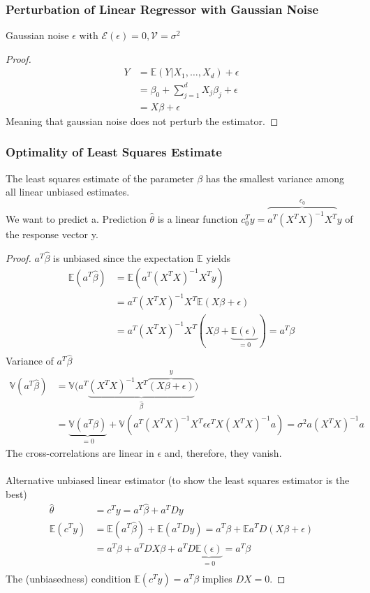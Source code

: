 \documentclass[MachineLearning]{subfiles}
\begin{document}
\subsubsection{Perturbation of Linear Regressor with Gaussian Noise}
Gaussian noise \(\epsilon\) with \(\mathcal{E}(\epsilon) = 0, \mathcal{V} = \sigma^2\)
\begin{proof}
\begin{align}
Y &= \mathbb{E}(Y|X_1 , \ldots , X_d) + \epsilon\\
&= \beta_0 + \sum^d_{j=1} X_j \beta_j + \epsilon\\
&= X\beta + \epsilon
\end{align}
Meaning that gaussian noise does not perturb the estimator.
\end{proof}

\subsubsection{Optimality of Least Squares Estimate}
The least squares estimate of the parameter \(\beta\) has the smallest variance among all linear unbiased estimates.\\
We want to predict a. Prediction \(\hat{\theta}\) is a linear function \(c_0^Ty = \overbrace{a^T (X^T X)^{-1} X^T}^{c_0} y\) of the response vector y.
\begin{proof}

\(a^T \hat{\beta}\) is unbiased since the expectation \(\mathbb{E}\) yields
\begin{align}
\mathbb{E}(a^T \hat{\beta}) &= \mathbb{E}(a^T (X^T X)^{-1} X^T y)\\
&= a^T (X^T X)^{-1} X^T \mathbb{E}(X\beta + \epsilon)\\
&= a^T (X^T X)^{-1} X^T (X\beta + \underbrace{\mathbb{E}(\epsilon)}_{=0} ) = a^T \beta\\
\end{align}
Variance of \(a^T\hat{\beta}\)
\begin{align}
\mathbb{V}(a^T \hat{\beta}) &= \mathbb{V}\Big( a^T \underbrace{(X^T X)^{-1} X^T \overbrace{(X\beta + \epsilon)}^{y}}_{\hat{\beta}}\Big)\\
&= \underbrace{\mathbb{V}(a^T \beta)}_{=0} +\mathbb{V}\left(a^T (X^T X)^{-1} X^T \epsilon\epsilon^T X(X^T X)^{-1} a\right)
= \sigma^2 a (X^T X)^{-1} a
\end{align}
The cross-correlations are linear in \(\epsilon\) and, therefore, they vanish.\\\\
Alternative unbiased linear estimator (to show the least squares estimator is the best)
\begin{align}
\hat{\theta} &= c^T y = a^T \hat{\beta} + a^T Dy\\
\mathbb{E}(c^T y) &= \mathbb{E}(a^T \hat{\beta}) + \mathbb{E}(a^T Dy) = a^T \beta + \mathbb{E} a^T D(X\beta + \epsilon)\\
&= a^T \beta + a^T DX\beta + a^T D \underbrace{\mathbb{E}(\epsilon)}_{=0} = a^T \beta\\
\end{align}
The (unbiasedness) condition \(\mathbb{E}(c^T y) = a^T \beta\) implies \(DX = 0\).
\end{proof}
\end{document}
